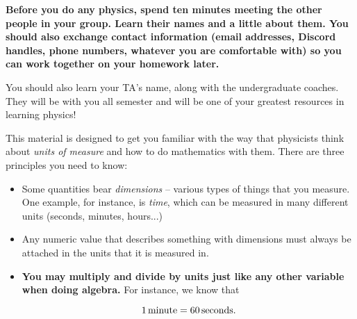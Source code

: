 \documentclass[12pt]{article}
\newcommand{\BI}{\begin{itemize}}
\newcommand{\EI}{\end{itemize}}
\begin{document}
\Large
\centerline{}

\normalsize
\centerline{}


{\bf Before you do any physics, spend ten minutes meeting the other people in your group. Learn their names and a little about them. You should also exchange
contact information (email addresses, Discord handles, phone numbers, whatever you are comfortable with) so you can work together on your homework later.

You should also learn your TA's name, along with the undergraduate coaches. They will be with you all semester and will be one of your greatest resources in learning physics!
}







This material is designed to get you familiar with the way that physicists think about {\it units of measure}
and how to do mathematics with them. There are three principles you need to know:

\BI
\item Some quantities bear {\it dimensions} -- various types of things that you measure. One example, for instance, is {\it time},
which can be measured in many different units (seconds, minutes, hours...)

\item Any numeric value that describes something with dimensions must always be attached in the units that it is measured in.

\item {\bf You may multiply and divide by units just like any other variable when doing algebra.}
For instance, we know that

$$
1 \,{\rm minute} = 60 \,{\rm seconds}.
$$
\EI
\end{document}
